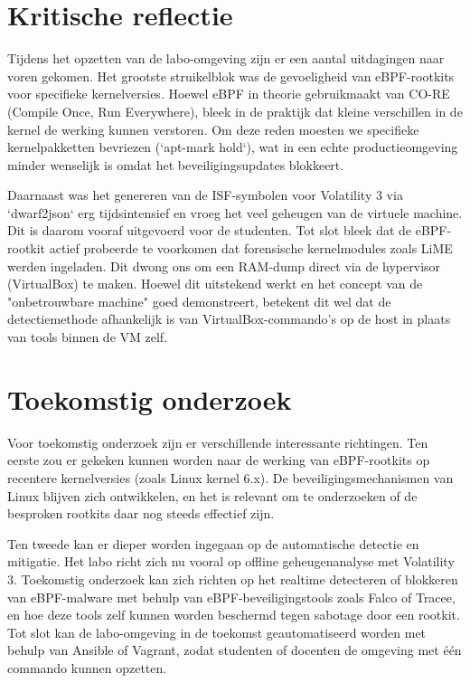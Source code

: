 \section{Kritische reflectie}
Tijdens het opzetten van de labo-omgeving zijn er een aantal uitdagingen naar voren gekomen. Het grootste struikelblok was de gevoeligheid van eBPF-rootkits voor specifieke kernelversies. Hoewel eBPF in theorie gebruikmaakt van CO-RE (Compile Once, Run Everywhere), bleek in de praktijk dat kleine verschillen in de kernel de werking kunnen verstoren. Om deze reden moesten we specifieke kernelpakketten bevriezen (`apt-mark hold`), wat in een echte productieomgeving minder wenselijk is omdat het beveiligingsupdates blokkeert.

Daarnaast was het genereren van de ISF-symbolen voor Volatility 3 via `dwarf2json` erg tijdsintensief en vroeg het veel geheugen van de virtuele machine. Dit is daarom vooraf uitgevoerd voor de studenten. Tot slot bleek dat de eBPF-rootkit actief probeerde te voorkomen dat forensische kernelmodules zoals LiME werden ingeladen. Dit dwong ons om een RAM-dump direct via de hypervisor (VirtualBox) te maken. Hoewel dit uitstekend werkt en het concept van de "onbetrouwbare machine" goed demonstreert, betekent dit wel dat de detectiemethode afhankelijk is van VirtualBox-commando's op de host in plaats van tools binnen de VM zelf.

\section{Toekomstig onderzoek}
Voor toekomstig onderzoek zijn er verschillende interessante richtingen. Ten eerste zou er gekeken kunnen worden naar de werking van eBPF-rootkits op recentere kernelversies (zoals Linux kernel 6.x). De beveiligingsmechanismen van Linux blijven zich ontwikkelen, en het is relevant om te onderzoeken of de besproken rootkits daar nog steeds effectief zijn.

Ten tweede kan er dieper worden ingegaan op de automatische detectie en mitigatie. Het labo richt zich nu vooral op offline geheugenanalyse met Volatility 3. Toekomstig onderzoek kan zich richten op het realtime detecteren of blokkeren van eBPF-malware met behulp van eBPF-beveiligingstools zoals Falco of Tracee, en hoe deze tools zelf kunnen worden beschermd tegen sabotage door een rootkit. Tot slot kan de labo-omgeving in de toekomst geautomatiseerd worden met behulp van Ansible of Vagrant, zodat studenten of docenten de omgeving met één commando kunnen opzetten.